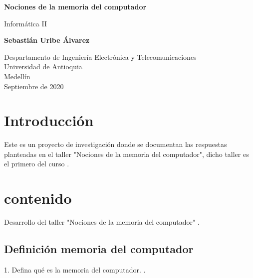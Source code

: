 \documentclass{article}
\begin{document}
\begin{titlepage}
    \begin{center}
        \vspace*{1cm}
            
        \Huge
        \textbf{Nociones de la memoria del computador}
            
        \vspace{0.5cm}
        \LARGE
        Informática II
            
        \vspace{1.5cm}
            
        \textbf{Sebastián Uribe Álvarez}
            
        \vfill
            
        \vspace{0.8cm}
            
        \Large
        Despartamento de Ingeniería Electrónica y Telecomunicaciones\\
        Universidad de Antioquia\\
        Medellín\\
        Septiembre de 2020
            
    \end{center}
\end{titlepage}

\tableofcontents

\section{Introducción}\label{Introducción}
Este es un proyecto de investigación donde se documentan las respuestas planteadas en el taller "Nociones de la memoria del computador", dicho taller es el primero del curso .

\section{contenido} \label{contenido}

Desarrollo del taller "Nociones de la memoria del computador"
. \cite{refer}


\subsection{Definición memoria del computador}\label{Definición memoria del computador}

1. Defina qué es la memoria del computador.
. \cite{refer}
\end{document}
